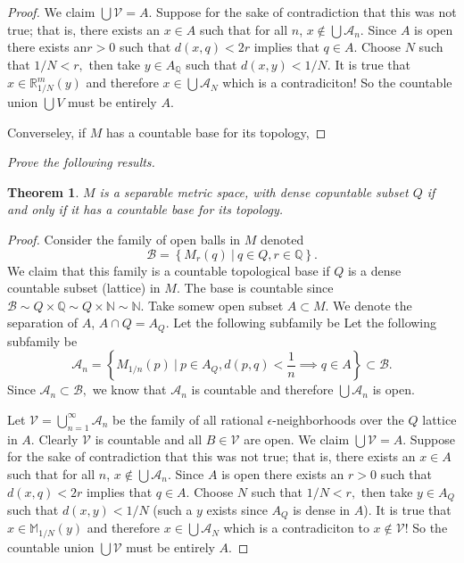 \documentclass[letter]{article}
\newtheorem{theorem}{Theorem}
\newenvironment{menumerate}{%
  \edef\backupindent{\the\parindent}%
  \enumerate%
  \setlength{\parindent}{\backupindent}%
}{\endenumerate}
\begin{document}
\begin{menumerate}
\begin{menumerate}
\begin{proof}
				We claim $\bigcup \mathcal{V} = A$. Suppose for the sake of contradiction that this was not true; that is, there exists an $x\in A$ such that for all $n$, $x\notin \bigcup \mathcal{A}_n.$ Since $A$ is open there exists an$r >0$ such that $d(x,q) < 2r$ implies that $q \in A.$ Choose $N$ such that  $1/N < r,$ then take $y \in A_\mathbb{Q}$ such that $d(x,y) < 1/N.$ It is true that $x \in \mathbb{R}^m_{1/N}(y)$ and therefore $x \in \bigcup \mathcal{A}_{N}$ which is a contradiciton! So the countable union $\bigcup V$ must be entirely $A.$

				Converseley, if $M$ has a countable base for its topology,  
			\end{proof}
		\end{menumerate}
	\item \emph{Prove the following results.}
		\begin{theorem}
			 $M$ is a separable metric space, with dense copuntable subset $Q$ if and only if it has a countable base for its topology. 
		\end{theorem}
		\begin{proof}
			Consider the family of open balls in $M$ denoted $$\mathcal{B} = \left\{M_r(q) \ |\ q \in Q, r \in \mathbb{Q}\right\}.$$ We claim that this family is a countable topological base if $Q$ is a dense countable subset (lattice) in $M.$ The base is countable since $\mathcal{B} \sim Q \times \mathbb{Q} \sim Q \times \mathbb{N} \sim \mathbb{N}.$ Take somew open subset $A \subset M$. We denote the separation of $A$, $A \cap Q = A_Q$. Let the following subfamily be 
			Let the following subfamily be  $$\mathcal{A}_n = \left\{M_{1/n}(p)\ \Big|\ p \in A_Q, d(p,q) < \frac{1}{n} \implies q \in A\right\} \subset \mathcal{B}.$$
			Since $\mathcal{A}_n \subset \mathcal{B},$ we know that $\mathcal{A}_n$ is countable and therefore $\bigcup \mathcal{A}_n$ is open.

			Let $\mathcal{V} = \bigcup_{n=1}^\infty \mathcal{A}_n$ be the family of all rational $\epsilon$-neighborhoods over the $Q$ lattice in $A.$ Clearly $\mathcal{V}$ is countable and all $B \in \mathcal{V}$ are open. We claim $\bigcup \mathcal{V} = A.$  Suppose for the sake of contradiction that this was not true; that is, there exists an $x\in A$ such that for all $n$, $x\notin \bigcup \mathcal{A}_n.$ Since $A$ is open there exists an $r >0$ such that $d(x,q) < 2r$ implies that $q \in A.$ Choose $N$ such that  $1/N < r,$ then take $y \in A_Q$ such that $d(x,y) < 1/N$ (such a $y$ exists since $A_Q$ is dense in $A$). It is true that $x \in \mathbb{M}_{1/N}(y)$ and therefore $x \in \bigcup \mathcal{A}_{N}$ which is a contradiciton to $x \notin \mathcal{V}$! So the countable union $\bigcup \mathcal{V}$ must be entirely $A.$


\end{proof}
\end{menumerate}
\end{document}
